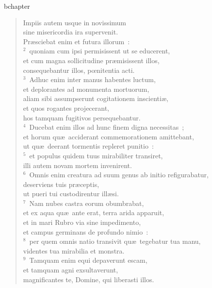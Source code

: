 bchapter\begin{flushleft}\begin{verse}\vspace{-19pt}\hspace{6pt}Impiis autem usque in novissimum\\\hspace{6pt} sine misericordia ira supervenit.\\ Pr\ae sciebat enim et futura illorum~:\\
${}^{2}$~quoniam cum ipsi permisissent ut se educerent,\\ et cum magna sollicitudine pr\ae misissent illos,\\ consequebantur illos, pœnitentia acti.\\
${}^{3}$~Adhuc enim inter manus habentes luctum,\\ et deplorantes ad monumenta mortuorum,\\ aliam sibi assumpserunt cogitationem inscienti\ae ,\\ et quos rogantes projecerant,\\ hos tamquam fugitivos persequebantur.\\
${}^{4}$~Ducebat enim illos ad hunc finem digna necessitas~;\\ et horum qu\ae\ acciderant commemorationem amittebant,\\ ut qu\ae\ deerant tormentis repleret punitio~:\\
${}^{5}$~et populus quidem tuus mirabiliter transiret,\\ illi autem novam mortem invenirent.\\
${}^{6}$~Omnis enim creatura ad suum genus ab initio refigurabatur,\\ deserviens tuis pr\ae ceptis,\\ ut pueri tui custodirentur ill\ae si.\\
${}^{7}$~Nam nubes castra eorum obumbrabat,\\ et ex aqua qu\ae\ ante erat, terra arida apparuit,\\ et in mari Rubro via sine impedimento,\\ et campus germinans de profundo nimio~:\\
${}^{8}$~per quem omnis natio transivit qu\ae\ tegebatur tua manu,\\ videntes tua mirabilia et monstra.\\
${}^{9}$~Tamquam enim equi depaverunt escam,\\ et tamquam agni exsultaverunt,\\ magnificantes te, Domine, qui liberasti illos.\\

\end{verse}
\end{flushleft}
